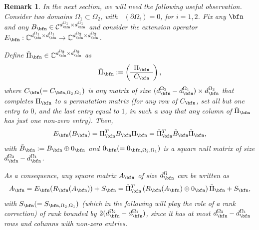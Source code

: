 \documentclass{amsart}
\newtheorem{rem}[thm]{Remark}
\DeclareMathOperator{\Ld}{\mathcal{L}^d}
\begin{document}
\begin{rem}\label{rem_obs_ext_operator}
    In the next section, we will need the following useful observation.
    Consider two domains $\Omega_1\subset\Omega_2$, with $\Ld(\partial\Omega_i)=0$, for $i=1,2$. Fix any $\bfn$ and any $B_\bfn\in\mathcal{C}^{d_\bfn^{\Omega_1}\times d_\bfn^{\Omega_1}}$ and consider the extension operator $E_{\bfn}:\mathbb{C}^{d_{\bfn}^{\Omega_1}\times d_{\bfn}^{\Omega_1}}\to\mathbb{C}^{d_{\bfn}^{\Omega_2}\times d_{\bfn}^{\Omega_2}}$. 
    
    Define $\tilde{\Pi}_\bfn\in\mathbb{C}^{d_{\bfn}^{\Omega_2}\times d_{\bfn}^{\Omega_2}}$ as 
    \begin{equation*}
           \tilde{\Pi}_\bfn:= \left(
    \begin{array}{c} 
      \Pi_\bfn \\
      \hline
      C_\bfn
    \end{array} 
    \right), 
    \end{equation*}
    where $C_\bfn(=C_{\bfn,\Omega_2,\Omega_1})$ is any matrix of size $(d_\bfn^{\Omega_2}-d_\bfn^{\Omega_1})\times d_\bfn^{\Omega_2}$ that completes $\Pi_\bfn$ to a permutation matrix (for any row of $C_\bfn$, set all but one entry to $0$, and the last entry equal to $1$, in such a way that any column of $\tilde{\Pi}_\bfn$ has just one non-zero entry). Then, 
    \begin{equation*}
        E_\bfn(B_\bfn)=\Pi_\bfn^{T}B_\bfn\Pi_\bfn=\tilde{\Pi}_\bfn^{T}\tilde{B}_\bfn\tilde{\Pi}_\bfn,
    \end{equation*}
    with $\tilde{B}_\bfn:=B_\bfn\oplus0_\bfn$ and $0_\bfn(=0_{\bfn,\Omega_2,\Omega_1})$ is a square null matrix of size $d_\bfn^{\Omega_2}-d_\bfn^{\Omega_1}$.
    
    As a consequence, any square matrix $A_\bfn$ of size $d_\bfn^{\Omega}$ can be written as 
    \begin{equation}\label{restr_ext_identity}
        A_\bfn=E_\bfn(R_\bfn(A_\bfn))+S_\bfn=\tilde{\Pi}_\bfn^{T}\left(R_\bfn(A_\bfn)\oplus0_\bfn\right)\tilde{\Pi}_\bfn+S_\bfn,
    \end{equation}
    with $S_\bfn(=S_{\bfn,\Omega_2,\Omega_1})$ (which in the following will play the role of a rank correction) of rank bounded by $2(d_\bfn^{\Omega_2}-d_\bfn^{\Omega_1})$, since it has at most $d_\bfn^{\Omega_2}-d_\bfn^{\Omega_1}$ rows and columns with non-zero entries.
\end{rem}
\end{document}
